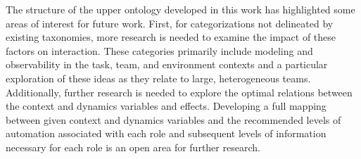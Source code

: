 \documentclass[letterpaper, 10 pt, conference]{ieeeconf}  %
\theoremstyle{definition}
\begin{document}
The structure of the upper ontology developed in this work has highlighted some areas of interest for future work. First, for categorizations not delineated by existing taxonomies, more research is needed to examine the impact of these factors on interaction. These categories primarily include modeling and observability in the task, team, and environment contexts and a particular exploration of these ideas as they relate to large, heterogeneous teams. Additionally, further research is needed to explore the optimal relations between the context and dynamics variables and effects.  Developing a full mapping between given context and dynamics variables and the recommended levels of automation associated with each role and subsequent levels of information necessary for each role is an open area for further research. 


\end{document}
